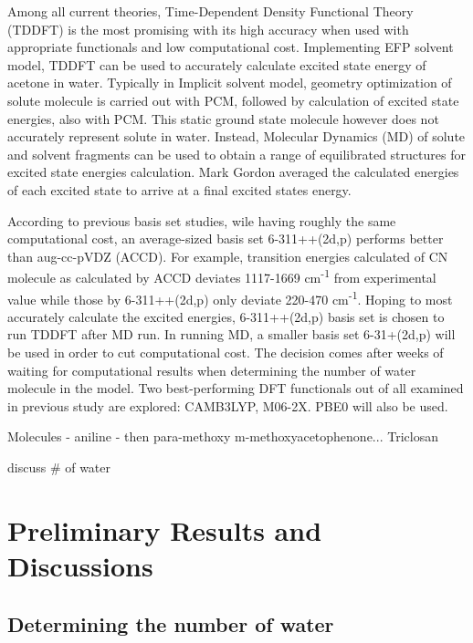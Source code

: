 \documentclass[
journal=jpcbfk, %
manuscript=article]{achemso}
\begin{document}
Among all current theories, Time-Dependent Density Functional Theory (TDDFT) is the most promising with its high accuracy when used with appropriate functionals and low computational cost\cite{Magyar2007}. Implementing EFP solvent model, TDDFT can be used to accurately calculate excited state energy of acetone in water.\cite{Yoo2008} Typically in Implicit solvent model, geometry optimization of solute molecule is carried out with PCM, followed by calculation of excited state energies, also with PCM. This static ground state molecule however does not accurately represent solute in water.\cite{Defusco2011} Instead, Molecular Dynamics (MD) of solute and solvent fragments can be used to obtain a range of equilibrated structures for excited state energies calculation. Mark Gordon averaged the calculated energies of each excited state to arrive at a final excited states energy.\cite{Defusco2011} 

According to previous basis set studies, wile having roughly the same computational cost, an average-sized basis set 6-311++(2d,p) performs better than aug-cc-pVDZ (ACCD).\cite{Wiberg2004,Barnes2014} For example, transition energies calculated of CN molecule as calculated by ACCD deviates 1117-1669 cm\textsuperscript{-1} from experimental value while those by 6-311++(2d,p) only deviate 220-470 cm\textsuperscript{-1}. Hoping to most accurately calculate the excited energies, 6-311++(2d,p) basis set is chosen to run TDDFT after MD run. In running MD, a smaller basis set 6-31+(2d,p) will be used in order to cut computational cost. The decision comes after weeks of waiting for computational results when determining the number of water molecule in the model. Two best-performing DFT functionals out of all examined in previous study are explored: CAMB3LYP, M06-2X.\cite{Barnes2014} PBE0 will also be used.

Molecules - aniline - then para-methoxy m-methoxyacetophenone... Triclosan

discuss \# of water



\section{Preliminary Results and Discussions}

\subsection{Determining the number of water}
\end{document}
